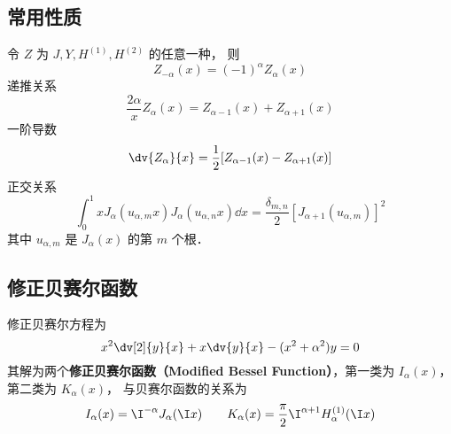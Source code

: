 \subsection{常用性质}
令 $Z$ 为 $J, Y, H^{(1)}, H^{(2)}$ 的任意一种， 则
\begin{equation}
Z_{-\alpha}(x) = (-1)^\alpha Z_\alpha(x)
\end{equation}
递推关系
\begin{equation}
\frac{2\alpha}{x} Z_\alpha(x) = Z_{\alpha -1}(x) + Z_{\alpha+1}(x)
\end{equation}
一阶导数
\begin{equation}
\dv{Z_\alpha}{x} = \frac12 [Z_{\alpha  - 1}(x) - Z_{\alpha +1}(x)]
\end{equation}
正交关系
\begin{equation}
\int_0^1 x J_\alpha (u_{\alpha ,m} x) J_\alpha (u_{\alpha ,n} x) \dd{x} = \frac{\delta_{m,n}}{2}[J_{\alpha + 1} (u_{\alpha ,m})]^2
\end{equation}
其中 $u_{\alpha, m}$ 是 $J_\alpha(x)$ 的第 $m$ 个根．

\subsection{修正贝赛尔函数}
修正贝赛尔方程为
\begin{equation}
x^2 \dv[2]{y}{x} + x \dv{y}{x} - (x^2 + \alpha ^2)y = 0
\end{equation}
其解为两个\textbf{修正贝赛尔函数（Modified Bessel Function）}，第一类为 $I_\alpha(x)$，  第二类为 $K_\alpha(x)$，  与贝赛尔函数的关系为
\begin{equation}
I_\alpha(x) = \I^{-\alpha} J_\alpha(\I x)
\qquad
K_\alpha(x) = \frac{\pi}{2} \I^{\alpha  + 1} H_\alpha ^{(1)}(\I x)
\end{equation}


